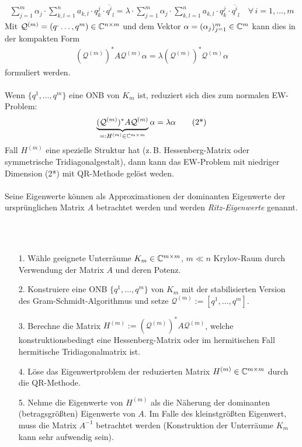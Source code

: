 \begin{align*}\sum_{j=1}^{m} \alpha_j\cdot \sum_{k,l=1}^{n} a_{k,l}\cdot q_k^{j}\cdot\overline{q^i}_l = 
\lambda\cdot \sum_{j=1}^{m} \alpha_j \cdot\sum_{k,l=1}^{n} a_{k,l}\cdot q_k^{j}\cdot\overline{q^i}_l
\quad\forall\, i=1,\dotsc,m\end{align*}
Mit $\mathcal{Q}^{(m)}=(q^,\dotsc,q^m)\in\mathbb C  ^{n\times m}$  und dem Vektor $\alpha=(\alpha_j)_{j=1}^m\in\mathbb C  ^m$ 
kann dies in der kompakten Form 
\begin{align*}(\mathcal{Q}^{(m)})^*A\mathcal{Q}^{(m)}\alpha = \lambda (\mathcal{Q}^{(m)})^*\mathcal{Q}^{(m)}\alpha\end{align*}
formuliert werden. \\ \\
Wenn $\{q^1,\dotsc,q^m\}$ eine ONB von $K_m$ ist, reduziert sich dies zum normalen EW-Problem:
\begin{align*}\underbrace{(\mathcal{Q}^{(m)})^*A\mathcal{Q}^{(m)}}_{=: H^{(m)}\in\mathbb C  ^{m\times m}}\alpha = 
\lambda \alpha \tag{2*}\end{align*}
Fall $H^{(m)}$ eine spezielle Struktur hat (z.\,B. Hessenberg-Matrix oder symmetrische Tridiagonalgestalt), dann kann 
das EW-Problem mit niedriger Dimension (2*) mit QR-Methode gelöst weden. \\ \\
Seine Eigenwerte können als Approximationen der dominanten Eigenwerte der ursprünglichen Matrix $A$ betrachtet werden
und werden \textit{Ritz-Eigenwerte} genannt. \\ \\
\begin{sumbox} \ 
  \begin{enumerate}
    \item[1.] Wähle geeignete Unterräume $K_m\in\mathbb C  ^{m\times m}$, $m\ll n$ Krylov-Raum durch Verwendung der 
    Matrix $A$ und deren Potenz.
    \item[2.] Konstruiere eine ONB $\{q^1,\dotsc, q^m\}$ von $K_m$ mit der stabilisierten Version des 
    Gram-Schmidt-Algorithmus und setze $\mathcal{Q}^{(m)}:=[q^1,\dotsc,q^m]$.
    \item[3.] Berechne die Matrix $H^{(m)}:=(\mathcal{Q}^{(m)})^*A\mathcal{Q}^{(m)}$, welche 
    konstruktionsbedingt eine Hessenberg-Matrix oder im hermitischen Fall hermitische Tridiagonalmatrix ist. 
    \item[4.] Löse das Eigenwertproblem der reduzierten Matrix $H^{(m)}\in\mathbb C  ^{m\times m}$ durch die 
    QR-Methode.
    \item[5.] Nehme die Eigenwerte von $H^{(m)}$ als die Näherung der dominanten (betragsgrößten) Eigenwerte 
    von $A$. Im Falle des kleinstgrößten Eigenwert, muss die Matrix $A^{-1}$ betrachtet werden (Konstruktion 
    der Unterräume $K_m$ kann sehr aufwendig sein).
  \end{enumerate}
\end{sumbox}
